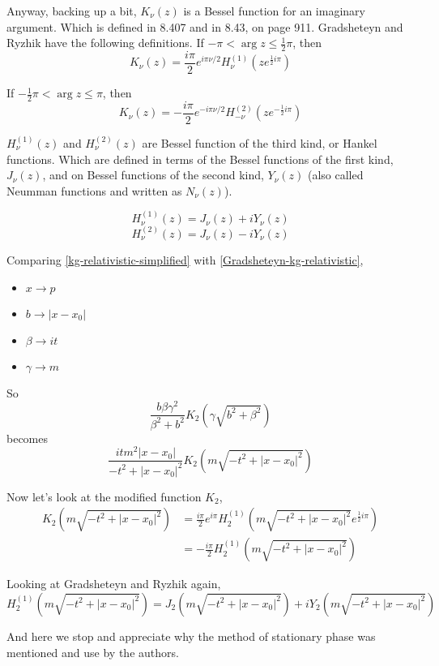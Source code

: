 Anyway, backing up a bit, $K_\nu (z)$ is a Bessel function for an imaginary argument.
Which is defined in 8.407 and in 8.43, on page 911.
Gradsheteyn and Ryzhik have the following definitions.
If $-\pi < \arg{z} \leq \frac{1}{2}\pi$, then
$$
K_\nu (z) = \frac{i\pi}{2} e^{i\pi\nu /2} H_{\nu}^{(1)} \left(z e^{\frac{1}{2} i\pi} \right)
$$

If $-\frac{1}{2}\pi < \arg{z} \leq \pi$, then
$$
K_\nu (z) = -\frac{i\pi}{2} e^{-i\pi\nu /2} H_{-\nu}^{(2)} \left(z e^{-\frac{1}{2} i\pi} \right)
$$

$H_{\nu}^{(1)} (z)$ and $H_{\nu}^{(2)} (z)$ are Bessel function of the third kind, or Hankel functions.
Which are defined in terms of the Bessel functions of the first kind, $J_{\nu}(z)$, and on Bessel functions
of the second kind, $Y_\nu (z)$ (also called Neumman functions and written as $N_\nu (z)$).

$$
H_{\nu}^{(1)} (z) = J_\nu (z) + i Y_\nu (z)
$$
$$
H_{\nu}^{(2)} (z) = J_\nu (z) - i Y_\nu (z)
$$

Comparing \ref{kg-relativistic-simplified} with \ref{Gradsheteyn-kg-relativistic},
\begin{itemize}
    \item $x \rightarrow p$
    \item $b \rightarrow |x-x_0|$
    \item $\beta \rightarrow it$
    \item $\gamma \rightarrow m$
\end{itemize}

So
$$
\frac{b \beta \gamma^2}{\beta^2 + b^2} K_2\left(\gamma \sqrt{b^2 + \beta^2}\right)
$$
becomes
$$
\frac{it m^2 |x-x_0| }{-t^2 + |x-x_0|^2} K_2\left(m \sqrt{ -t^2 + |x-x_0|^2}\right)
$$

Now let's look at the modified function $K_2$,
\begin{align*}
K_2\left(m \sqrt{ -t^2 + |x-x_0|^2}\right) &=
    \frac{i\pi}{2} e^{i\pi} H_{2}^{(1)} \left(m \sqrt{ -t^2 + |x-x_0|^2} e^{\frac{1}{2} i\pi} \right) \\
    &= - \frac{i\pi}{2} H_{2}^{(1)} \left(m \sqrt{ -t^2 + |x-x_0|^2} \right)
\end{align*}

Looking at Gradsheteyn and Ryzhik again,
$$
H_{2}^{(1)} \left(m \sqrt{ -t^2 + |x-x_0|^2} \right) =
    J_2 \left(m \sqrt{ -t^2 + |x-x_0|^2} \right) + i Y_2 \left(m \sqrt{ -t^2 + |x-x_0|^2} \right)
$$

And here we stop and appreciate why the method of stationary phase was mentioned and use by the authors.

